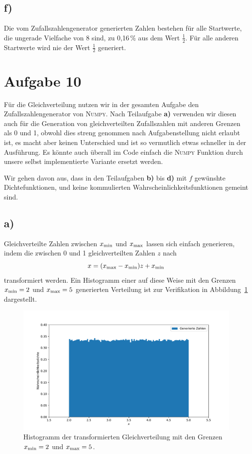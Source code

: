 \documentclass[a4paper, 11pt]{article}
\begin{document}
\subsection*{f)}
Die vom Zufallszahlengenerator generierten Zahlen bestehen für alle Startwerte, die ungerade Vielfache von 8 sind, zu 0,16\,\% aus dem Wert $\frac{1}{2}$. Für alle anderen Startwerte wird nie der Wert $\frac{1}{2}$ generiert. 

\section*{Aufgabe 10}
Für die Gleichverteilung nutzen wir in der gesamten Aufgabe den Zufallszahlengenerator von \textsc{Numpy}. Nach Teilaufgabe \textbf{a)} verwenden wir diesen auch für die Generation von gleichverteilten Zufallszahlen mit anderen Grenzen als 0 und 1, obwohl dies streng genommen nach Aufgabenstellung nicht erlaubt ist, es macht aber keinen Unterschied und ist so vermutlich etwas schneller in der Ausführung. Es könnte auch überall im Code einfach die \textsc{Numpy} Funktion durch unsere selbst implementierte Variante ersetzt werden.

Wir gehen davon aus, dass in den Teilaufgaben \textbf{b)} bis \textbf{d)} mit $f$ gewünshte Dichtefunktionen, und keine kommulierten Wahrscheinlichkeitsfunktionen gemeint sind.

\subsection*{a)}
Gleichverteilte Zahlen zwischen $x_\textup{min}$ und $x_\textup{max}$ lassen sich einfach generieren, indem die zwischen 0 und 1 gleichverteilten Zahlen $z$ nach
\begin{equation} 
    x = (x_\textup{max} - x_\textup{min})z + x_\textup{min}
    \label{eqn:unitrans}
\end{equation}
transformiert werden. Ein Histogramm einer auf diese Weise mit den Grenzen $x_\textup{min} = 2$ und $x_\textup{max} = 5$ generierten Verteilung ist zur Verifikation in Abbildung~\ref{fig:a10a} dargestellt.
\begin{figure}
    \centering
    \includegraphics[width=\textwidth]{../A10/A10a.pdf}
    \caption{Histogramm der transformierten Gleichverteilung mit den Grenzen $x_\textup{min} = 2$ und $x_\textup{max} = 5$.}
    \label{fig:a10a}
\end{figure}
\FloatBarrier
\end{document}
